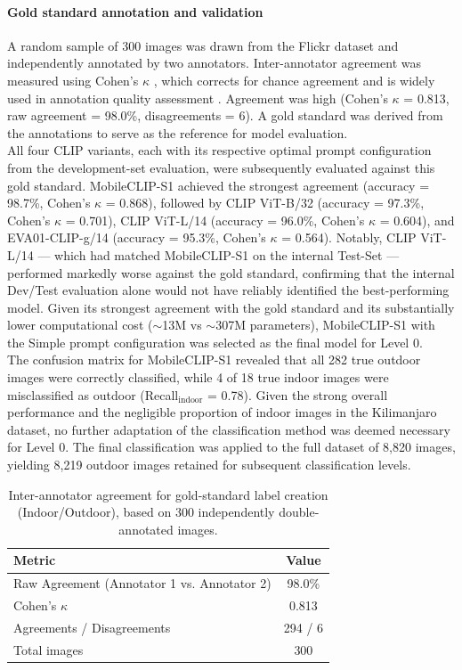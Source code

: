 \documentclass[hidelinks, 11pt]{article}
\begin{document}
\paragraph{Gold standard annotation and validation}
A random sample of 300 images was drawn from the Flickr dataset and independently annotated by two annotators. Inter-annotator agreement was measured using Cohen's $\kappa$ \citep{cohen_coefficient_1960}, which corrects for chance agreement and is widely used in annotation quality assessment \citep{artstein_survey_2008,cardoso_classifying_2022}. Agreement was high (Cohen's $\kappa$ = 0.813, raw agreement = 98.0\%, disagreements = 6). A gold standard was derived from the annotations to serve as the
reference for model evaluation.
\\
All four CLIP variants, each with its respective optimal prompt configuration from the development-set evaluation, were subsequently evaluated against this gold standard. MobileCLIP-S1 achieved the strongest
agreement (accuracy = 98.7\%, Cohen's $\kappa$ = 0.868), followed by CLIP ViT-B/32 (accuracy = 97.3\%, Cohen's $\kappa$ = 0.701), CLIP ViT-L/14 (accuracy = 96.0\%, Cohen's $\kappa$ = 0.604), and EVA01-CLIP-g/14
(accuracy = 95.3\%, Cohen's $\kappa$ = 0.564). Notably, CLIP ViT-L/14 — which had matched MobileCLIP-S1 on the internal Test-Set — performed markedly worse against the gold standard, confirming that the internal Dev/Test evaluation alone would not have reliably identified the best-performing model. Given its strongest agreement with the gold standard and its substantially lower computational cost ($\sim$13M vs
$\sim$307M parameters), MobileCLIP-S1 with the Simple prompt configuration was selected as the final model for Level 0.
\\
The confusion matrix for MobileCLIP-S1 revealed that all 282 true outdoor images were correctly classified, while 4 of 18 true indoor images were misclassified as outdoor (Recall$_{\mathrm{indoor}}$ = 0.78). Given the
strong overall performance and the negligible proportion of indoor images in the Kilimanjaro dataset, no further adaptation of the classification method was deemed necessary for Level 0. The final classification was applied to the full dataset of 8,820 images, yielding 8,219 outdoor images retained for subsequent classification levels.

\begin{table}[htbp]
\centering
\caption{Inter-annotator agreement for gold-standard label creation (Indoor/Outdoor), based on 300 independently double-annotated images.}
\label{tab:interannotator_indooroutdoor}
\begin{tabular}{@{}lc@{}}
\toprule
\textbf{Metric} & \textbf{Value} \\
\midrule
Raw Agreement (Annotator 1 vs. Annotator 2) & 98.0\% \\
Cohen's $\kappa$                             & 0.813 \\
Agreements / Disagreements                    & 294 / 6 \\
Total images                                  & 300 \\
\bottomrule
\end{tabular}
\end{table}
\end{document}
